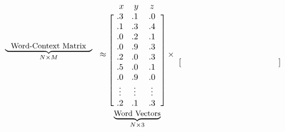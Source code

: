 \begin{figure}[ht!]
\[\begin{blockarray}{c@{\hspace{4mm}}c@{\hspace{2mm}}c@{\hspace{2mm}}c@{\hspace{2mm}}c@{\hspace{2mm}}c@{\hspace{2mm}}c@{\hspace{2mm}}c@{\hspace{2mm}}c@{\hspace{2mm}}c}
		& \BAmulticolumn{9}{c}{\underbrace{\small\text{\phantom{C}Word-Context Matrix}\phantom{C}}_{N \times M}} \\
	\end{blockarray}
	\approx
	\begin{blockarray}{c@{\hspace{3mm}}c@{\hspace{2mm}}c}
		\rot{\phantom{\textsf{\small{context }$M$}}}x~ & ~y & z \\
		\begin{block}{[c@{\hspace{2mm}}c@{\hspace{2mm}}c]}
			.3 & .1 & .0 \\ .1 & .3 & .4 \\ .0 & .2 & .1 \\ .0 & .9 & .3 \\ .2 & .0 & .3 \\ .5 & .0 & .1 \\ .0 & .9 & .0 \\ \vdots & \vdots & \vdots \\ .2 & .1 & .3 \\
		\end{block}
		\BAmulticolumn{3}{c}{\underbrace{\small\text{Word Vectors}}_{N \times 3}} \\
	\end{blockarray}
	\times
	\begin{blockarray}{c@{\hspace{2mm}}c@{\hspace{2mm}}c@{\hspace{2mm}}c@{\hspace{2mm}}c@{\hspace{2mm}}c@{\hspace{2mm}}c@{\hspace{2mm}}c@{\hspace{2mm}}c}
		\BAmulticolumn{9}{c}{\phantom{\underbrace{\small\text{\phantom{Conte}Context Vectors}\phantom{Conte}}_{3 \times M}}} \\
		\BAmulticolumn{9}{c}{\vspace{-2.5mm}} \\
		\begin{block}{[c@{\hspace{2mm}}c@{\hspace{2mm}}c@{\hspace{2mm}}c@{\hspace{2mm}}c@{\hspace{2mm}}c@{\hspace{2mm}}c@{\hspace{2mm}}c@{\hspace{2mm}}c]}

\end{block}
\end{blockarray}\]
\end{figure}

